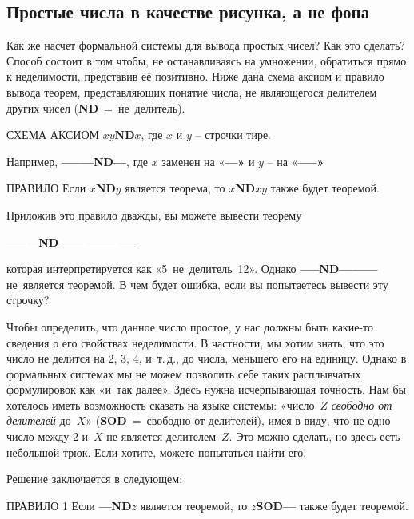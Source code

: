 \documentclass[../main.tex]{subfiles}
\begin{document}
\subsection{Простые числа в качестве рисунка, а не фона}

Как же насчет формальной системы для вывода простых чисел? Как это сделать? Способ состоит в том чтобы, не останавливаясь на умножении, обратиться прямо к неделимости, представив её позитивно. Ниже дана схема аксиом и правило вывода теорем, представляющих понятие числа, не являющегося делителем других чисел (\textbf{ND}~=~не~делитель).

\begin{mybox}{СХЕМА АКСИОМ}
    \textbf{$xy$ND$x$}, где $x$ и $y$ \--- строчки тире.
\end{mybox}

Например, \textbf{--{}--{}--{}--{}--ND--{}--}, где $x$ заменен на «\textbf{--{}--»} и $y$ \--- на «\textbf{--{}--{}--»}

\begin{mybox}{ПРАВИЛО}
    Если \textbf{$x$ND$y$} является теорема, то \textbf{$x$ND$xy$} также будет теоремой.
\end{mybox}

Приложив это правило дважды, вы можете вывести теорему
%
\begin{center}
    \textbf{--{}--{}--{}--{}--ND--{}--{}--{}--{}--{}--{}--{}--{}--{}--{}--{}--}
\end{center}
%
которая интерпретируется как «5~не~делитель~12». Однако \textbf{--{}--{}--ND--{}--{}--{}--{}--{}--} не~является теоремой. В чем будет ошибка, если вы попытаетесь вывести эту строчку?

Чтобы определить, что данное число простое, у нас должны быть какие-то сведения о его свойствах неделимости. В частности, мы хотим знать, что это число не делится на 2, 3, 4, и~т.\,д., до числа, меньшего его на единицу. Однако в формальных системах мы не можем позволить себе таких расплывчатых формулировок как «и~так далее». Здесь нужна исчерпывающая точность. Нам бы хотелось иметь возможность сказать на языке системы: «число~$Z$ \emph{свободно от делителей} до~$X$» (\textbf{SOD}~=~свободно от делителей), имея в виду, что не одно число между 2 и~$X$ не является делителем~$Z$. Это можно сделать, но здесь есть небольшой трюк. Если хотите, можете попытаться найти его.

Решение заключается в следующем:

\begin{mybox}{ПРАВИЛО 1}
    Если \textbf{--{}--ND$z$} является теоремой, то \textbf{$z$SOD--{}--} также будет теоремой.
\end{mybox}
\end{document}
